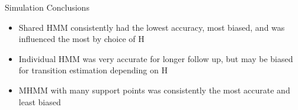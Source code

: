 \documentclass{beamer}
\begin{document}
    
\begin{frame}{Simulation Conclusions}
\begin{itemize}
    \item Shared HMM consistently had the lowest accuracy, most biased, and was influenced the most by choice of H
    \item Individual HMM was very accurate for longer follow up, but may be biased for transition estimation depending on H
    \item MHMM with many support points was consistently the most accurate and least biased 
\end{itemize}

    
\end{frame}


    
    
\end{document}
